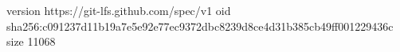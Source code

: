 version https://git-lfs.github.com/spec/v1
oid sha256:c091237d11b19a7e5e92e77ec9372dbc8239d8ce4d31b385cb49ff001229436c
size 11068
